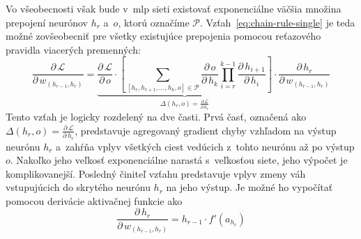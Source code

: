     Vo všeobecnosti však bude v~\acrshort{mlp} sieti existovať exponenciálne väčšia množina prepojení neurónov $h_r$ a~$o$, ktorú označíme $\mathcal{P}$. Vzťah~\ref{eq:chain-rule-single} je teda možné zovšeobecniť pre všetky existujúce prepojenia pomocou reťazového pravidla viacerých premenných:
    \begin{equation}
      \frac{\partial\, \mathcal{L}}{\partial\, w_{(h_{r-1},h_r)}} = 
      \underbrace{
        \frac{\partial\, \mathcal{L}}{\partial\, o} \cdot
          \left[ \sum_{[h_r, h_{r+1},\dots,h_k,o]\in \mathcal{P}} 
            \frac{\partial\, o}{\partial\, h_k} \prod_{i=r}^{k-1} \frac{\partial\, h_{i+1}}{\partial\, h_i}
        \right] }_{\Delta(h_r, o) = \frac{\partial\, \mathcal{L}}{\partial\, h_r}} \cdot
      \frac{\partial\, h_r}{\partial\, w_{(h_{r-1},h_r)}}
      \label{eq:chain-rule-multi}
    \end{equation}
    Tento vzťah je logicky rozdelený na dve časti. Prvá časť, označená ako $\Delta(h_r, o) = \frac{\partial\, \mathcal{L}}{\partial\, h_r}$, predstavuje agregovaný gradient chyby vzhľadom na výstup neurónu $h_r$ a~zahŕňa vplyv všetkých ciest vedúcich z~tohto neurónu až po výstup $o$. Nakoľko jeho veľkosť exponenciálne narastá s~veľkosťou siete, jeho výpočet je komplikovanejší. Posledný činiteľ vzťahu predstavuje vplyv zmeny váh vstupujúcich do skrytého neurónu $h_r$ na jeho výstup. Je možné ho vypočítať pomocou derivácie aktivačnej funkcie ako
    \begin{equation}
      \frac{\partial\, h_r}{\partial\, w_{(h_{r-1},h_r)}} = h_{r-1} \cdot f'(a_{h_r})
    \end{equation} 
    
